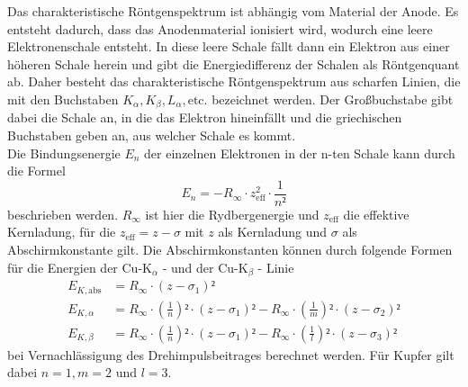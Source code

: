Das charakteristische Röntgenspektrum ist abhängig vom Material der Anode. Es entsteht dadurch, dass das Anodenmaterial ionisiert wird, wodurch eine leere 
Elektronenschale entsteht. In diese leere Schale fällt dann ein Elektron aus einer höheren Schale herein und gibt die Energiedifferenz der Schalen als Röntgenquant 
ab. Daher besteht das charakteristische Röntgenspektrum aus scharfen Linien, die mit den Buchstaben $K_\alpha, K_\beta, L_\alpha, \text{etc.}$ bezeichnet werden. Der
Großbuchstabe gibt dabei die Schale an, in die das Elektron hineinfällt und die griechischen Buchstaben geben an, aus welcher Schale es kommt. \\
Die Bindungsenergie $E_n$ der einzelnen Elektronen in der n-ten Schale kann durch die Formel 
\begin{equation}
E_n = - R_{\infty} \cdot z^{2}_{\text{eff}} \cdot \frac{1}{n²}
\end{equation}
beschrieben werden. $R_{\infty}$ ist hier die Rydbergenergie und $z_{\text{eff}}$ die effektive Kernladung, für die $z_{\text{eff}} = z - \sigma$ mit $z$ als Kernladung 
und $\sigma$ als Abschirmkonstante gilt. 
Die Abschirmkonstanten können durch folgende Formen für die Energien der $\text{Cu-K}_\alpha$ - und der $\text{Cu-K}_{\beta}$ - Linie 
\begin{align}
    E_{K,\text{abs}} &= R_{\infty} \cdot \left(z - \sigma_1\right)² \label{eqn:Kupfer_Linien_Energien_abs} \\
    E_{K,\alpha} &= R_{\infty} \cdot \left(\frac{1}{n}\right)² \cdot \left(z - \sigma_1\right)² - R_{\infty} \cdot \left(\frac{1}{m}\right)² \cdot \left(z - \sigma_2\right)² \label{eqn:Kupfer_Linien_Energien_alpha}\\
    E_{K,\beta} &= R_{\infty} \cdot \left(\frac{1}{n}\right)² \cdot \left(z - \sigma_1\right)² - R_{\infty} \cdot \left(\frac{1}{l}\right)² \cdot \left(z - \sigma_3\right)² \label{eqn:Kupfer_Linien_Energien_beta}
 \end{align}
bei Vernachlässigung des Drehimpulsbeitrages berechnet werden. Für Kupfer gilt dabei $n = 1, m = 2$ und $l = 3$. \\


